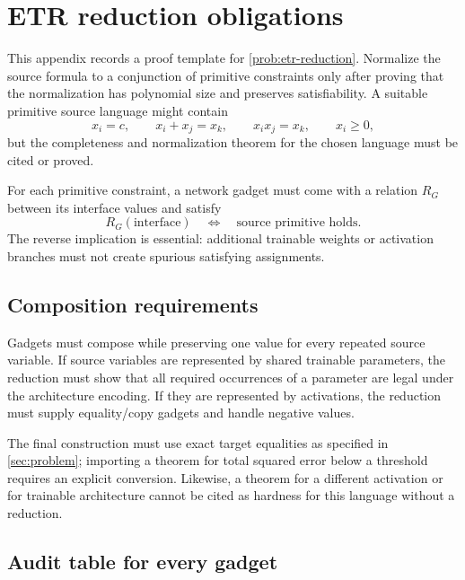 \section{ETR reduction obligations}
\label{app:etr}

This appendix records a proof template for
\cref{prob:etr-reduction}.  Normalize the source formula to a conjunction of
primitive constraints only after proving that the normalization has polynomial
size and preserves satisfiability.  A suitable primitive source language might
contain
\begin{equation}
 x_i=c,\qquad x_i+x_j=x_k,\qquad x_ix_j=x_k,
 \qquad x_i\ge0,
\end{equation}
but the completeness and normalization theorem for the chosen language must be
cited or proved.

For each primitive constraint, a network gadget must come with a relation
\(R_G\) between its interface values and satisfy
\begin{equation}
 R_G(\text{interface})
 \quad\Longleftrightarrow\quad
 \text{source primitive holds}.
\end{equation}
The reverse implication is essential: additional trainable weights or
activation branches must not create spurious satisfying assignments.

\subsection{Composition requirements}

Gadgets must compose while preserving one value for every repeated source
variable.  If source variables are represented by shared trainable parameters,
the reduction must show that all required occurrences of a parameter are legal
under the architecture encoding.  If they are represented by activations, the
reduction must supply equality/copy gadgets and handle negative values.

The final construction must use exact target equalities as specified in
\cref{sec:problem}; importing a theorem for total squared error below a
threshold requires an explicit conversion.  Likewise, a theorem for a
different activation or for trainable architecture cannot be cited as hardness
for this language without a reduction.

\subsection{Audit table for every gadget}

